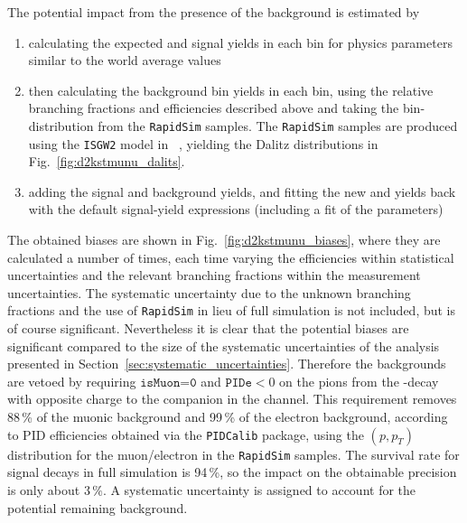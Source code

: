 The potential impact from the presence of the background is estimated by 
\begin{enumerate}
    \item calculating the expected \BtoDpi and \BtoDK signal yields in each bin for physics parameters similar to the world average values
    \item then calculating the background bin yields in each bin, using the relative branching fractions and efficiencies described above and taking the bin-distribution from the \texttt{RapidSim} samples. The \texttt{RapidSim} samples are produced using the \texttt{ISGW2} model in \evtgen~\cite{EvtGen}, yielding the Dalitz distributions in Fig.~\ref{fig:d2kstmunu_dalits}.
    \item adding the signal and background yields, and fitting the new \BtoDpi and \BtoDK yields back with the default signal-yield expressions (including a fit of the \Fi parameters)
\end{enumerate}
The obtained biases are shown in Fig.~\ref{fig:d2kstmunu_biases}, where they are calculated a number of times, each time varying the efficiencies within statistical uncertainties and the relevant branching fractions within the measurement uncertainties. The  systematic uncertainty due to the unknown branching fractions and the use of \texttt{RapidSim} in lieu of full simulation is not included, but is of course significant. Nevertheless it is clear that the potential biases are significant compared to the size of the systematic uncertainties of the analysis presented in Section~\ref{sec:systematic_uncertainties}. Therefore the backgrounds are vetoed by requiring $\texttt{isMuon=0}$ and $\texttt{PIDe} < 0$ on the pions from the \D-decay with opposite charge to the companion in the \DtoKspipi channel. This requirement removes 88\,\% of the muonic background and 99\,\% of the electron background, according to PID efficiencies obtained via the  \texttt{PIDCalib} package, using the $(p, p_T)$ distribution for the muon/electron in the \texttt{RapidSim} samples. The survival rate for signal decays in full simulation is 94\,\%, so the impact on the obtainable precision is only about $3\,\%$. A systematic uncertainty is assigned to account for the potential remaining background.

